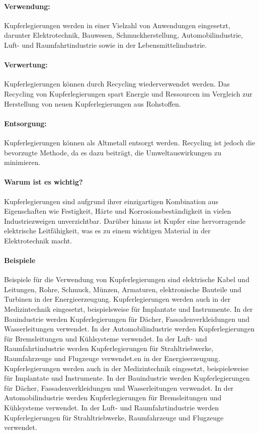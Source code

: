 \documentclass{article}
\begin{document}
\begin{multicols}{3}
\paragraph{Verwendung:}
Kupferlegierungen werden in einer Vielzahl von Anwendungen eingesetzt,
  darunter Elektrotechnik, Bauwesen, Schmuckherstellung, Automobilindustrie,
  Luft- und Raumfahrtindustrie sowie in der Lebensmittelindustrie.

\paragraph{Verwertung:}
Kupferlegierungen können durch Recycling wiederverwendet werden. Das
  Recycling von Kupferlegierungen spart Energie und Ressourcen im Vergleich zur
  Herstellung von neuen Kupferlegierungen aus Rohstoffen.

\paragraph{Entsorgung:}
Kupferlegierungen können als Altmetall entsorgt werden. Recycling ist
  jedoch die bevorzugte Methode, da es dazu beiträgt, die Umweltauswirkungen zu
  minimieren.

\paragraph{Warum ist es wichtig?}
Kupferlegierungen sind aufgrund ihrer einzigartigen Kombination aus
  Eigenschaften wie Festigkeit, Härte und Korrosionsbeständigkeit in vielen
  Industriezweigen unverzichtbar. Darüber hinaus ist Kupfer eine hervorragende
  elektrische Leitfähigkeit, was es zu einem wichtigen Material in der
  Elektrotechnik macht.

\paragraph{Beispiele}
Beispiele für die Verwendung von Kupferlegierungen sind elektrische Kabel
  und Leitungen, Rohre, Schmuck, Münzen, Armaturen, elektronische Bauteile und
  Turbinen in der Energieerzeugung. Kupferlegierungen werden auch in der
  Medizintechnik eingesetzt, beispielsweise für Implantate und Instrumente. In
  der Bauindustrie werden Kupferlegierungen für Dächer, Fassadenverkleidungen
  und Wasserleitungen verwendet. In der Automobilindustrie werden
  Kupferlegierungen für Bremsleitungen und Kühlsysteme verwendet. In der Luft-
  und Raumfahrtindustrie werden Kupferlegierungen für Strahltriebwerke,
  Raumfahrzeuge und Flugzeuge verwendet.en in der Energieerzeugung.
  Kupferlegierungen werden auch in der Medizintechnik eingesetzt,
  beispielsweise für Implantate und Instrumente. In der Bauindustrie werden
  Kupferlegierungen für Dächer, Fassadenverkleidungen und Wasserleitungen
  verwendet. In der Automobilindustrie werden Kupferlegierungen für
  Bremsleitungen und Kühlsysteme verwendet. In der Luft- und Raumfahrtindustrie
  werden Kupferlegierungen für Strahltriebwerke, Raumfahrzeuge und Flugzeuge
  verwendet.

\end{multicols}
\clearpage
\end{document}
